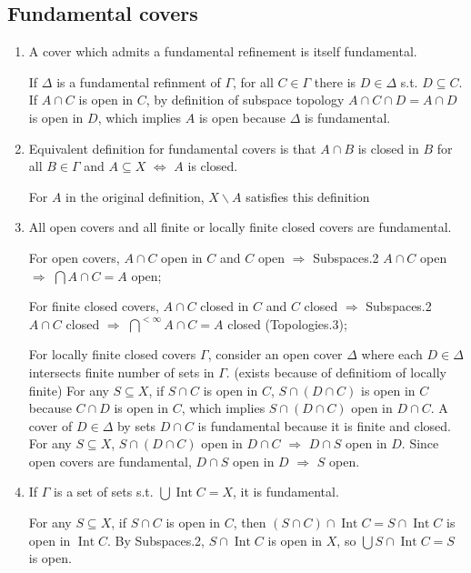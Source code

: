 \documentclass{article}
\DeclareMathOperator{\Int}{Int}
\begin{document}
\subsection{Fundamental covers}
\begin{enumerate}
\item A cover which admits a fundamental refinement is itself fundamental.

If \(\Delta\) is a fundamental refinment of \(\Gamma\), for all \(C\in\Gamma\) there is \(D\in\Delta\) s.t. \(D\subseteq C\).
If \(A\cap C\) is open in \(C\), by definition of subspace topology \(A\cap C\cap D=A\cap D\) is open in \(D\), which implies \(A\) is open because \(\Delta\) is fundamental.
\item Equivalent definition for fundamental covers is that \(A\cap B\) is closed in \(B\) for all \(B\in \Gamma\) and \(A\subseteq X\) \(\Longleftrightarrow\) \(A\) is closed.

For \(A\) in the original definition, \(X\backslash A\) satisfies this definition
\item All open covers and all finite or locally finite closed covers are fundamental. 

For open covers, \(A\cap C\) open in \(C\) and \(C\) open \(\Longrightarrow\) \color{gray}Subspaces.2 \color{black} \(A\cap C\) open \(\Longrightarrow\) \(\bigcap A\cap C=A\) open;

For finite closed covers, \(A\cap C\) closed in \(C\) and \(C\) closed \(\Longrightarrow\) \color{gray}Subspaces.2 \color{black} \(A\cap C\) closed \(\Longrightarrow\) \(\bigcap^{<\infty}A\cap C=A\) closed \color{gray}(Topologies.3)\color{black};

For locally finite closed covers \(\Gamma\), consider an open cover \(\Delta\) where each \(D\in\Delta\) intersects finite number of sets in \(\Gamma\). (exists because of definitiom of \color{gray}locally finite\color{black})
For any \(S\subseteq X\), if \(S\cap C\) is open in \(C\), \(S\cap (D\cap C)\) is open in \(C\) because \(C\cap D\) is open in \(C\), which implies \(S\cap (D\cap C)\) open in \(D\cap C\).
A cover of \(D\in\Delta\) by sets \(D\cap C\) is fundamental because it is finite and closed.
For any \(S\subseteq X\), \(S\cap (D\cap C)\) open in \(D\cap C\) \(\Longrightarrow\) \(D\cap S\) open in \(D\).
Since open covers are fundamental, \(D\cap S\) open in \(D\) \(\Longrightarrow\) \(S\) open.
\item If \(\Gamma\) is a set of sets s.t. \(\bigcup \Int C=X\), it is fundamental.

For any \(S\subseteq X\), if \(S\cap C\) is open in \(C\), then \((S\cap C)\cap \Int C=S\cap \Int C\) is open in \(\Int C\). 
By \color{gray}Subspaces.2\color{black}, \(S\cap\Int C\) is open in \(X\), so \(\bigcup S\cap\Int C=S\) is open.
\end{enumerate}
\end{document}
